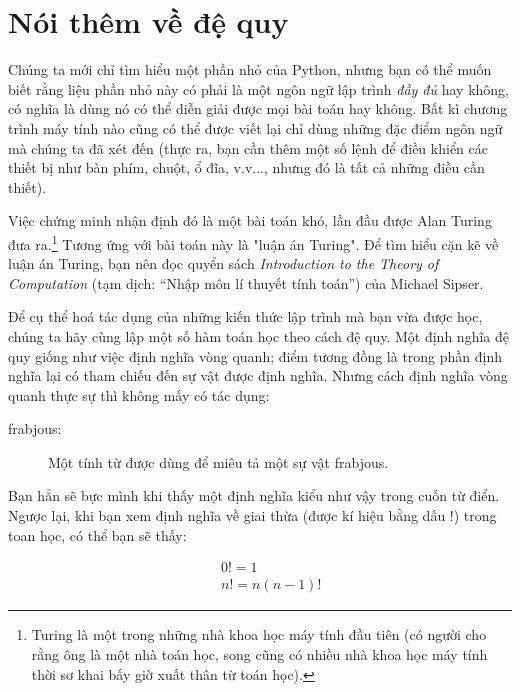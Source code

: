 \documentclass[11pt]{book}
\begin{document}
\section{Nói thêm về đệ quy}


Chúng ta mới chỉ tìm hiểu một phần nhỏ của Python, nhưng bạn có thể
muốn biết rằng liệu phần nhỏ này có phải là một ngôn ngữ lập trình 
{\em đầy đủ} hay không, có nghĩa là dùng nó có thể diễn giải được mọi 
bài toán hay không. Bất kì chương trình máy tính nào cũng có thể được
viết lại chỉ dùng những đặc điểm ngôn ngữ mà chúng ta đã xét đến 
(thực ra, bạn cần thêm một số lệnh để điều khiển các thiết bị như
bàn phím, chuột, ổ đĩa, v.v..., nhưng đó là tất cả những điều cần thiết).

Việc chứng minh nhận định đó là một bài toán khó, lần đầu được Alan
Turing đưa ra.\footnote{Turing là một trong những nhà khoa học máy tính đầu tiên
(có người cho rằng ông là một nhà toán học, song cũng có nhiều nhà 
khoa học máy tính thời sơ khai bấy giờ xuất thân từ toán học).} Tương
ứng với bài toán này là "luận án Turing". Để tìm hiểu cặn kẽ về luận án
Turing, bạn nên đọc quyển sách {\em Introduction to the
Theory of Computation} (tạm dịch: ``Nhập môn lí thuyết tính toán'') 
của Michael Sipser.

Để cụ thể hoá tác dụng của những kiến thức lập trình mà bạn vừa được học,
chúng ta hãy cùng lập một số hàm toán học theo cách đệ quy. Một định
nghĩa đệ quy giống như việc định nghĩa vòng quanh; điểm tương đồng là
trong phần định nghĩa lại có tham chiếu đến sự vật được định nghĩa. Nhưng
cách định nghĩa vòng quanh thực sự thì không mấy có tác dụng:

\begin{description}

\item[frabjous:] Một tính từ được dùng để miêu tả một sự vật frabjous.

\end{description}


Bạn hẳn sẽ bực mình khi thấy một định nghĩa kiểu như vậy trong cuốn 
từ điển. Ngược lại, khi bạn xem định nghĩa về giai thừa (được kí hiệu bằng
dấu $!$) trong toan học, có thể bạn sẽ thấy:

\vspace{-0.35in}
\begin{eqnarray*}
&&  0! = 1 \\
&&  n! = n (n-1)!
\end{eqnarray*}
\vspace{-0.25in}
\end{document}
